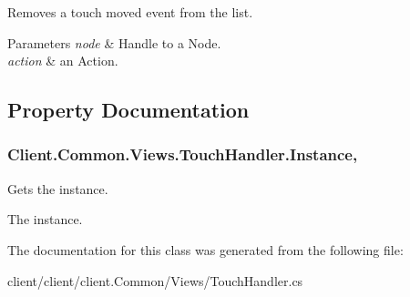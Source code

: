 Removes a touch moved event from the list. 


\begin{DoxyParams}{Parameters}
{\em node} & Handle to a Node.\\
\hline
{\em action} & an Action.\\
\hline
\end{DoxyParams}


\subsection{Property Documentation}
\hypertarget{classClient_1_1Common_1_1Views_1_1TouchHandler_a7e254f6b907749393dd3f65a38f5bec1}{}
\subsubsection[{Instance}]{ Client.\+Common.\+Views.\+Touch\+Handler.\+Instance\hspace{0.3cm}{\ttfamily [static]}, {\ttfamily [get]}}\label{classClient_1_1Common_1_1Views_1_1TouchHandler_a7e254f6b907749393dd3f65a38f5bec1}


Gets the instance. 

The instance.

The documentation for this class was generated from the following file\+:\begin{DoxyCompactItemize}
\item 
client/client/client.\+Common/\+Views/Touch\+Handler.\+cs\end{DoxyCompactItemize}
